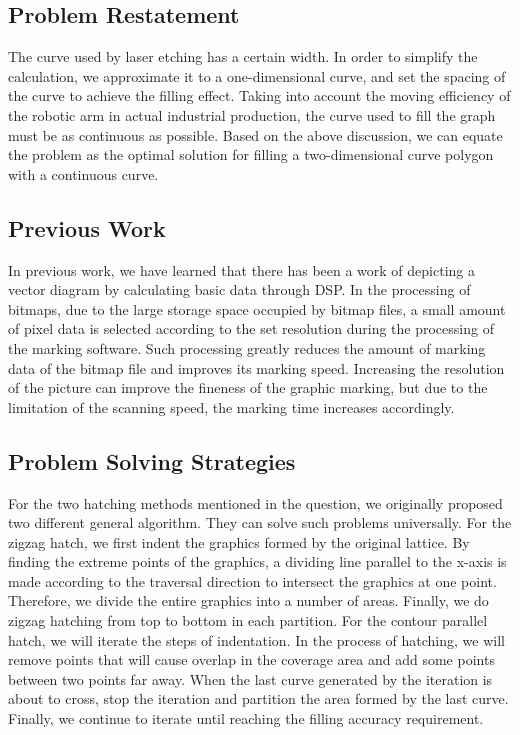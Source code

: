 \documentclass{apmcmthesis}
\begin{document}
\subsection{Problem Restatement}
The curve used by laser etching has a certain width. In order to simplify the calculation, we approximate it to a one-dimensional curve, and set the spacing of the curve to achieve the filling effect. Taking into account the moving efficiency of the robotic arm in actual industrial production, the curve used to fill the graph must be as continuous as possible. Based on the above discussion, we can equate the problem as the optimal solution for filling a two-dimensional curve polygon with a continuous curve.


\subsection{Previous Work}
In previous work, we have learned that there has been a work of depicting a vector diagram by calculating basic data through DSP. In the processing of bitmaps, due to the large storage space occupied by bitmap files, a small amount of pixel data is selected according to the set resolution during the processing of the marking software. Such processing greatly reduces the amount of marking data of the bitmap file and improves its marking speed. Increasing the resolution of the picture can improve the fineness of the graphic marking, but due to the limitation of the scanning speed, the marking time increases accordingly.


\subsection{Problem Solving Strategies}
For the two hatching methods mentioned in the question, we originally proposed two different general algorithm. They can solve such problems universally.
For the zigzag hatch, we first indent the graphics formed by the original lattice. By finding the extreme points of the graphics, a dividing line parallel to the x-axis is made according to the traversal direction to intersect the graphics at one point. Therefore, we divide the entire graphics into a number of areas. Finally, we do zigzag hatching from top to bottom in each partition.
For the contour parallel hatch, we will iterate the steps of indentation. In the process of hatching, we will remove points that will cause overlap in the coverage area and add some points between two points far away. When the last curve generated by the iteration is about to cross, stop the iteration and partition the area formed by the last curve. Finally, we continue to iterate until reaching the filling accuracy requirement.
\end{document}
